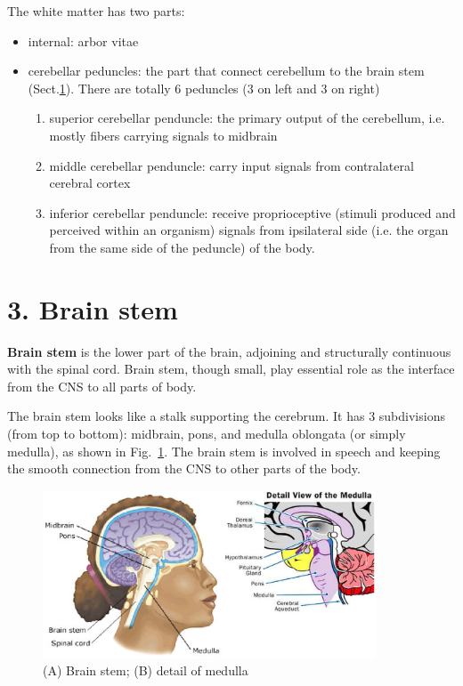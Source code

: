 The white matter has two parts:
\begin{itemize}
  \item internal: arbor vitae
  \item cerebellar peduncles: the part that connect cerebellum to the brain stem
  (Sect.\ref{sec:brain-stem}). There are totally 6 peduncles (3 on left and 3
  on right) 
  \begin{enumerate}
    \item superior cerebellar penduncle: the primary output of the cerebellum,
    i.e. mostly fibers carrying signals to midbrain
    
    \item middle cerebellar penduncle: carry input signals from contralateral
    cerebral cortex
    
    \item inferior cerebellar penduncle: receive proprioceptive (stimuli
    produced and perceived within an organism) signals from 
    ipsilateral side (i.e. the organ from the same side of the peduncle) of the
    body.
    
  \end{enumerate} 
\end{itemize}


\section{3. Brain stem}
\label{sec:brain-stem}

{\bf Brain stem} is the lower part of the brain, adjoining and structurally
continuous with the spinal cord. Brain stem, though small, play essential role
as the interface from the CNS to all parts of body.

The brain stem looks like a stalk supporting the cerebrum. It has 3
subdivisions (from top to bottom): midbrain, pons, and medulla oblongata (or
simply medulla), as shown in Fig.~\ref{fig:brain_stem}. The brain stem is involved in speech and
keeping the smooth connection from the CNS to other parts of the body.

\begin{figure}[hbt]
  \centerline{\includegraphics[height=5cm,
    angle=0]{./images/slice_brain.eps}}
\caption{(A) Brain stem; (B) detail of medulla}
\label{fig:brain_stem}
\end{figure}


